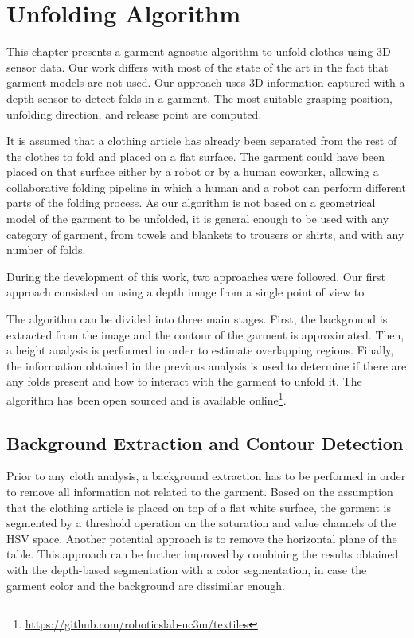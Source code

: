 \chapter{Unfolding Algorithm}
\label{architecture}

This chapter presents a garment-agnostic algorithm to unfold clothes using 3D sensor data. Our work differs with most of the state of the art in the fact that garment models are not used. Our approach uses 3D information captured with a depth sensor to detect folds in a garment. The most suitable grasping position, unfolding direction, and release point are computed.

It is assumed that a clothing article has already been separated from the rest of the clothes to fold and placed on a flat surface. The garment could have been placed on that surface either by a robot or by a human coworker, allowing a collaborative folding pipeline in which a human and a robot can perform different parts of the folding process.
As our algorithm is not based on a geometrical model of the garment to be unfolded, it is general enough to be used with any category of garment, from towels and blankets to trousers or shirts, and with any number of folds. 

During the development of this work, two approaches were followed. Our first approach consisted on using a depth image from a single point of view to 

The algorithm can be divided into three main stages. First, the background is extracted from the image and the contour of the garment is approximated. Then, a height analysis is performed in order to estimate overlapping regions. Finally, the information obtained in the previous analysis is used to determine if there are any folds present and how to interact with the garment to unfold it. The algorithm has been open sourced and is available online\footnote{\url{https://github.com/roboticslab-uc3m/textiles}}.

\section{Background Extraction and Contour Detection}

Prior to any cloth analysis, a background extraction has to be performed in order to remove all information not related to the garment.
Based on the assumption that the clothing article is placed on top of a flat white surface, the garment is segmented by a threshold operation on the saturation and value channels of the HSV space. Another potential approach is to remove the horizontal plane of the table. This approach can be further improved by combining the results obtained with the depth-based segmentation with a color segmentation, in case the garment color and the background are dissimilar enough.

